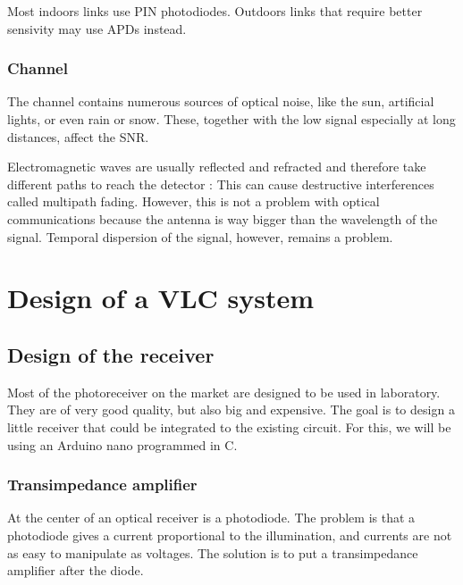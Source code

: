 \documentclass[12pt]{report}
\begin{document}
Most indoors links use PIN photodiodes. Outdoors links that require better sensivity may use APDs instead.

\subsection{Channel}

The channel contains numerous sources of optical noise, like the sun, artificial lights, or even rain or snow. These, together with the low signal especially at long distances, affect the SNR.

Electromagnetic waves are usually reflected and refracted and therefore take different paths to reach the detector : This can cause destructive interferences called multipath fading. However, this is not a problem with optical communications because the antenna is way bigger than the wavelength of the signal. Temporal dispersion of the signal, however, remains a problem.













\chapter{Design of a VLC system}

\section{Design of the receiver}

Most of the photoreceiver on the market are designed to be used in laboratory. They are of very good quality, but also big and expensive. The goal is to design a little receiver that could be integrated to the existing circuit.
For this, we will be using an Arduino nano programmed in C.



\subsection{Transimpedance amplifier}

At the center of an optical receiver is a photodiode. The problem is that a photodiode gives a current proportional to the illumination, and currents are not as easy to manipulate as voltages. The solution is to put a transimpedance amplifier after the diode.
\end{document}
